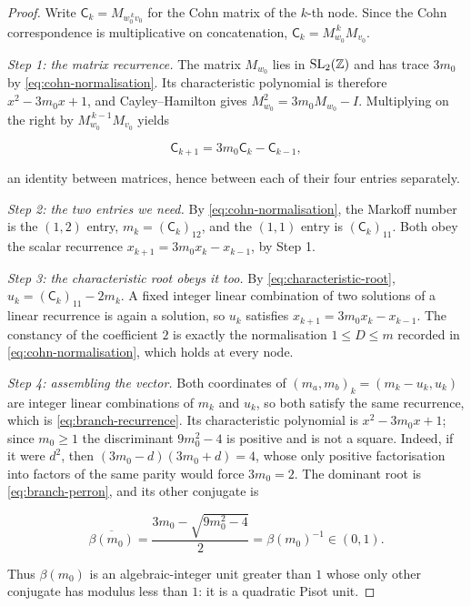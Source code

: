 \begin{proof}
Write $\mathsf C_k=M_{w_0^{\,k}v_0}$ for the Cohn matrix of the $k$-th node. Since
the Cohn correspondence is multiplicative on concatenation,
$\mathsf C_k=M_{w_0}^{\,k}M_{v_0}$.

\emph{Step 1: the matrix recurrence.} The matrix $M_{w_0}$ lies in
$\mathrm{SL}_2(\mathbb{Z})$ and has trace $3m_0$ by
\cref{eq:cohn-normalisation}. Its characteristic polynomial is therefore
$x^2-3m_0x+1$, and Cayley--Hamilton gives
$M_{w_0}^2=3m_0M_{w_0}-I$. Multiplying on the right by
$M_{w_0}^{\,k-1}M_{v_0}$ yields

\begin{equation}
 \mathsf C_{k+1}=3m_0\mathsf C_k-\mathsf C_{k-1},
 \label{eq:matrix-recurrence}
\end{equation}

an identity between matrices, hence between each of their four entries
separately.

\emph{Step 2: the two entries we need.} By \cref{eq:cohn-normalisation}, the
Markoff number is the $(1,2)$ entry, $m_k=(\mathsf C_k)_{12}$, and the $(1,1)$ entry
is $(\mathsf C_k)_{11}$. Both obey the scalar recurrence
$x_{k+1}=3m_0x_k-x_{k-1}$, by Step 1.

\emph{Step 3: the characteristic root obeys it too.} By
\cref{eq:characteristic-root}, $u_k=(\mathsf C_k)_{11}-2m_k$. A fixed integer linear
combination of two solutions of a linear recurrence is again a solution, so
$u_k$ satisfies $x_{k+1}=3m_0x_k-x_{k-1}$. The constancy of the coefficient
$2$ is exactly the normalisation $1\leqslant D\leqslant m$ recorded in
\cref{eq:cohn-normalisation}, which holds at every node.

\emph{Step 4: assembling the vector.} Both coordinates of
$(m_a,m_b)_k=(m_k-u_k,u_k)$ are integer linear combinations of $m_k$ and
$u_k$, so both satisfy the same recurrence, which is
\cref{eq:branch-recurrence}. Its characteristic polynomial is
$x^2-3m_0x+1$; since $m_0\geqslant1$ the discriminant $9m_0^2-4$ is positive
and is not a square. Indeed, if it were $d^2$, then
$(3m_0-d)(3m_0+d)=4$, whose only positive factorisation into factors of the
same parity would force $3m_0=2$. The dominant root is
\cref{eq:branch-perron}, and its other conjugate is

\begin{equation}
 \overline{\beta(m_0)}
 =\frac{3m_0-\sqrt{9m_0^2-4}}2
 =\beta(m_0)^{-1}\in(0,1).
 \label{eq:branch-pisot-conjugate}
\end{equation}

Thus $\beta(m_0)$ is an algebraic-integer unit greater than $1$ whose only
other conjugate has modulus less than $1$: it is a quadratic Pisot unit.
\end{proof}

